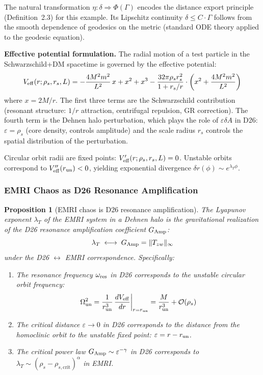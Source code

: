 \documentclass[
]{article}
\newtheorem{proposition}[theorem]{Proposition}
\begin{document}
The natural transformation $\eta: \delta \Rightarrow \Phi(\Gamma)$ encodes the distance export principle (Definition~2.3) for this example. Its Lipschitz continuity $\delta \leq C \cdot \Gamma$ follows from the smooth dependence of geodesics on the metric (standard ODE theory applied to the geodesic equation).

\textbf{Effective potential formulation.} The radial motion of a test particle in the Schwarzschild+DM spacetime is governed by the effective potential:
\begin{equation}\label{eq:veff}
V_{\rm eff}(r; \rho_s, r_s, L) = -\frac{4M^2m^2}{L^2}\,x + x^2 + x^3 - \frac{32\pi\rho_s r_s^2}{1 + r_s/r} \cdot \left(x^2 + \frac{4M^2m^2}{L^2}\right)
\end{equation}
where $x = 2M/r$. The first three terms are the Schwarzschild contribution (resonant structure: $1/r$ attraction, centrifugal repulsion, GR correction). The fourth term is the Dehnen halo perturbation, which plays the role of $\varepsilon\delta A$ in D26: $\varepsilon = \rho_s$ (core density, controls amplitude) and the scale radius $r_s$ controls the spatial distribution of the perturbation.

Circular orbit radii are fixed points: $V_{\rm eff}'(r; \rho_s, r_s, L) = 0$. Unstable orbits correspond to $V_{\rm eff}''(r_{\rm un}) < 0$, yielding exponential divergence $\delta r(\phi) \sim e^{\lambda_T \phi}$.

\subsubsection{EMRI Chaos as D26 Resonance Amplification}\label{subsec:emri-resonance}

\begin{proposition}[EMRI chaos is D26 resonance amplification]\label{prop:emri-chaos-resonance}
The Lyapunov exponent $\lambda_T$ of the EMRI system in a Dehnen halo is the gravitational realization of the D26 resonance amplification coefficient $G_{\rm Amp}$:
\begin{equation}
\lambda_T \;\longleftrightarrow\; G_{\rm Amp} = \|T_{zw}\|_\infty
\end{equation}
under the D26 $\leftrightarrow$ EMRI correspondence. Specifically:
\begin{enumerate}
\item The resonance frequency $\omega_{\rm res}$ in D26 corresponds to the unstable circular orbit frequency:
\begin{equation}\label{eq:omega_un}
\Omega_{\rm un}^2 = \frac{1}{r_{\rm un}^3}\,\frac{dV_{\rm eff}}{dr}\bigg|_{r=r_{\rm un}} = \frac{M}{r_{\rm un}^3} + \mathcal{O}(\rho_s)
\end{equation}
\item The critical distance $\varepsilon \to 0$ in D26 corresponds to the distance from the homoclinic orbit to the unstable fixed point: $\varepsilon = r - r_{\rm un}$.
\item The critical power law $G_{\rm Amp} \sim \varepsilon^{-\gamma}$ in D26 corresponds to $\lambda_T \sim (\rho_s - \rho_{s,\text{crit}})^\alpha$ in EMRI.
\end{enumerate}
\end{proposition}
\end{document}
